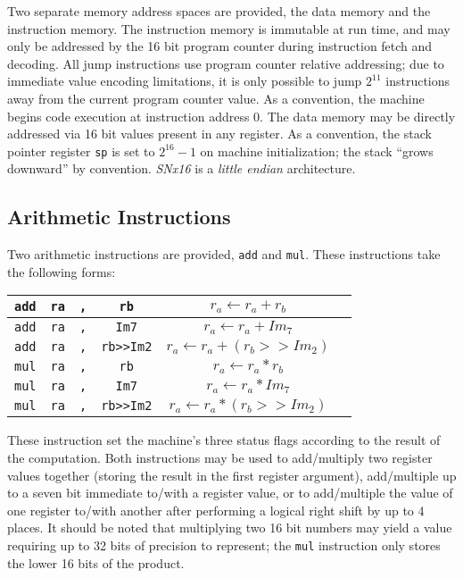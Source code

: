 \documentclass{article}
\begin{document}
Two separate memory address spaces are provided, the data memory and the
instruction memory. The instruction memory is immutable at run time, and may
only be addressed by the 16 bit program counter during instruction fetch and
decoding. All jump instructions use program counter relative addressing; due to
immediate value encoding limitations, it is only possible to jump $2^{11}$
instructions away from the current program counter value. As a convention, the
machine begins code execution at instruction address 0. The data memory may be
directly addressed via 16 bit values present in any register. As a convention,
the stack pointer register \texttt{sp} is set to $2^{16} - 1$ on machine
initialization; the stack ``grows downward'' by convention. \emph{SNx16} is
a \emph{little endian} architecture.

\subsection{Arithmetic Instructions}

Two arithmetic instructions are provided, \texttt{add} and \texttt{mul}. These
instructions take the following forms:

\begin{center}
\begin{tabular}{|c|c|c|c|c|c|}
\hline
\texttt{add} & \texttt{ra} &\texttt{,} & \texttt{rb} & $r_{a} \leftarrow r_{a} + r_{b}$ \\ \hline
\texttt{add} & \texttt{ra} &\texttt{,} & \texttt{Im7} & $r_{a} \leftarrow r_{a} + Im_{7}$ \\ \hline
\texttt{add} & \texttt{ra} &\texttt{,} & \texttt{rb>>Im2} & $r_{a} \leftarrow r_{a} + (r_{b} >> Im_{2})$ \\ \hline
\texttt{mul} & \texttt{ra} &\texttt{,} & \texttt{rb} & $r_{a} \leftarrow r_{a} * r_{b}$ \\ \hline
\texttt{mul} & \texttt{ra} &\texttt{,} & \texttt{Im7} & $r_{a} \leftarrow r_{a} * Im_{7}$ \\ \hline
\texttt{mul} & \texttt{ra} &\texttt{,} & \texttt{rb>>Im2} & $r_{a} \leftarrow r_{a} * (r_{b} >> Im_{2})$ \\ \hline
\end{tabular}
\end{center}

These instruction set the machine's three status flags according to the result
of the computation. Both instructions may be used to add/multiply two register values
together (storing the result in the first register argument), add/multiple up to a seven
bit immediate to/with a register value, or to add/multiple the value of one register to/with
another after performing a logical right shift by up to 4 places. It should be
noted that multiplying two 16 bit numbers may yield a value requiring up to 32
bits of precision to represent; the \texttt{mul} instruction only stores the
lower 16 bits of the product.
\end{document}
